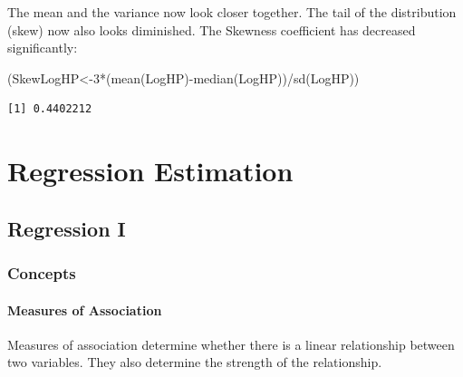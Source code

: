 \documentclass[
  letterpaper,
  DIV=11,
  numbers=noendperiod]{scrreprt}
\newenvironment{Shaded}{\begin{snugshade}}{\end{snugshade}}
\newcommand{\DecValTok}[1]{\textcolor[rgb]{0.68,0.00,0.00}{#1}}
\newcommand{\FunctionTok}[1]{\textcolor[rgb]{0.28,0.35,0.67}{#1}}
\newcommand{\NormalTok}[1]{\textcolor[rgb]{0.00,0.23,0.31}{#1}}
\newcommand{\OtherTok}[1]{\textcolor[rgb]{0.00,0.23,0.31}{#1}}
\newcommand{\SpecialCharTok}[1]{\textcolor[rgb]{0.37,0.37,0.37}{#1}}
\begin{document}
The mean and the variance now look closer together. The tail of the
distribution (skew) now also looks diminished. The Skewness coefficient
has decreased significantly:

\begin{Shaded}
\begin{Highlighting}[numbers=left,,]
\NormalTok{(SkewLogHP}\OtherTok{\textless{}{-}}\DecValTok{3}\SpecialCharTok{*}\NormalTok{(}\FunctionTok{mean}\NormalTok{(LogHP)}\SpecialCharTok{{-}}\FunctionTok{median}\NormalTok{(LogHP))}\SpecialCharTok{/}\FunctionTok{sd}\NormalTok{(LogHP))}
\end{Highlighting}
\end{Shaded}

\begin{verbatim}
[1] 0.4402212
\end{verbatim}

\part{Regression Estimation}

\hypertarget{regression-i}{%
\chapter{Regression I}\label{regression-i}}

\hypertarget{concepts-5}{%
\section{Concepts}\label{concepts-5}}

\hypertarget{measures-of-association}{%
\subsection*{Measures of Association}\label{measures-of-association}}

Measures of association determine whether there is a linear relationship
between two variables. They also determine the strength of the
relationship.
\end{document}
